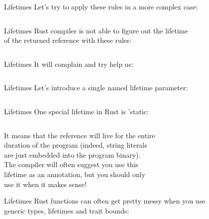 \documentclass[usenames,dvipsnames,10pt,aspectratio=169]{beamer}
\begin{document}
\begin{frame}{Lifetimes}
	\large
	Let's try to apply these rules in a more complex case:
	\vspace{0.2cm}
	\inputminted[fontsize=\large]{rust}{code/lifetimes4.rs}
\end{frame}

\begin{frame}{Lifetimes}
	\large
	Rust compiler is not able to figure out the lifetime\\
	of the returned reference with these rules:
	\vspace{0.2cm}
	\inputminted[fontsize=\large]{rust}{code/lifetimes5.rs}
\end{frame}

\begin{frame}{Lifetimes}
	\large
	It will complain and try help us:
	\vspace{0.2cm}
	\inputminted[fontsize=\large]{rust}{code/lifetimes6.rs}
\end{frame}

\begin{frame}{Lifetimes}
	\large
	Let's introduce a single named lifetime parameter:
	\vspace{0.2cm}
	\inputminted[fontsize=\large]{rust}{code/lifetimes7.rs}
\end{frame}

\begin{frame}{Lifetimes}
	\large
	One special lifetime in Rust is \textcolor{ucuyellow}{'static}:
	\vspace{0.2cm}
	\inputminted[fontsize=\Large]{rust}{code/lifetimes8.rs}
	\vspace{0.2cm}
	It means that the reference will live for the entire\\
	duration of the program (indeed, string literals\\
	are just embedded into the program binary).\\
	\vspace{0.2cm}
	The compiler will often suggest you use this\\
	lifetime as an annotation, but you should only\\
	use it when it makes sense!
\end{frame}

\begin{frame}{Lifetimes}
	\large
	Rust functions can often get pretty messy when you use\\
	generic types, lifetimes and trait bounds:
	\vspace{0.2cm}
	\inputminted[fontsize=\large]{rust}{code/lifetimes9.rs}
\end{frame}
\end{document}
